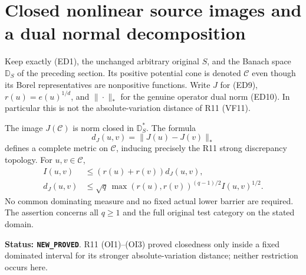 \section{Closed nonlinear source images and a dual normal decomposition}
\label{sec:r12-nonlinear-dual-source}

Keep exactly (ED1), the unchanged arbitrary original $S$, and the
Banach space $\mathbb D_S$ of the preceding section. Its positive
potential cone is denoted $\mathscr C$ even though its Borel
representatives are nonpositive functions. Write $J$ for (ED9),
$r(u)=e(u)^{1/d}$, and $\|\cdot\|_*$ for the genuine operator
dual norm (ED10). In particular this is not the absolute-variation
distance of R11 (VF11).

\begin{theorem}
\label{thm:r12-closed-full-source-image}
The image $J(\mathscr C)$ is norm closed in $\mathbb D_S^*$.
The formula
\[
                 d_J(u,v)=\|J(u)-J(v)\|_*
 \tag{NI1}
\]
defines a complete metric on $\mathscr C$, inducing precisely the
R11 strong discrepancy topology. For $u,v\in\mathscr C$,
\[
 \begin{split}
 I(u,v)&\leq(r(u)+r(v))d_J(u,v),\\
 d_J(u,v)&\leq\sqrt q\,
     \max(r(u),r(v))^{(q-1)/2}I(u,v)^{1/2}.
 \end{split}
 \tag{NI2}
\]
No common dominating measure and no fixed actual lower barrier
are required. The assertion concerns all $q\geq1$ and the full
original test category on the stated domain.
\end{theorem}

\noindent\textbf{Status: \texttt{NEW\_PROVED}}. R11 (OI1)--(OI3)
proved closedness only inside a fixed dominated interval for its
stronger absolute-variation distance; neither restriction occurs here.

